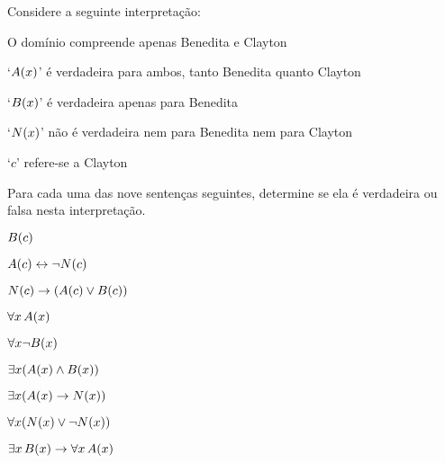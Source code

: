 \practiceproblems
\solutions
\problempart
\label{pr.TorF1}
Considere a seguinte interpretação:
	\begin{ebullet}\small
		\item O domínio compreende apenas Benedita e Clayton
		\item `$\mathord{A}(x)$' é verdadeira para ambos, tanto Benedita quanto Clayton
		\item `$\mathord{B}(x)$' é verdadeira apenas para Benedita
		\item `$\mathord{N}(x)$' não é verdadeira nem para Benedita nem para Clayton
		\item `$c$' refere-se a Clayton
	\end{ebullet}
Para cada uma das nove sentenças seguintes, determine se ela é verdadeira ou falsa nesta interpretação.
\begin{earg}
\item $\mathord{B}(c) $
\item $\mathord{A}(c)  \leftrightarrow \neg \mathord{N}(c)$
\item $\mathord{N}(c)  \rightarrow (\mathord{A}(c) \vee \mathord{B}(c))$
\item $\forall x\, \mathord{A}(x)$
\item $\forall x \neg \mathord{B}(x)$
\item $\exists x(\mathord{A}(x) \wedge \mathord{B}(x))$
\item $\exists x(\mathord{A}(x) \rightarrow \mathord{N}(x))$
\item $\forall x(\mathord{N}(x) \vee \neg \mathord{N}(x))$
\item $\exists x\, \mathord{B}(x) \rightarrow \forall x\, \mathord{A}(x)$
\end{earg}


